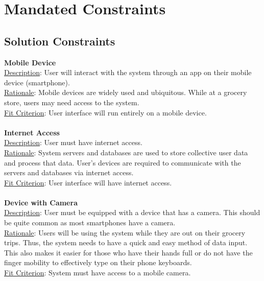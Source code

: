 \documentclass[12pt]{article}
\begin{document}
\section{Mandated Constraints}
\subsection{Solution Constraints}
\textbf{Mobile Device}\\
\underline{Description}: User will interact with the system through an app on their mobile device (smartphone).\\
\underline{Rationale}: Mobile devices are widely used and ubiquitous. While at a grocery store, users may need access to the system.\\
\underline{Fit Criterion}: User interface will run entirely on a mobile device.\\
\\
\textbf{Internet Access}\\ %
\underline{Description}: User must have internet access.\\
\underline{Rationale}: System servers and databases are used to store collective user data and process that data. User's devices are required to communicate with the servers and databases via internet access.\\
\underline{Fit Criterion}: User interface will have internet access.\\
\\
\textbf{Device with Camera}\\
\underline{Description}: User must be equipped with a device that has a camera. This should be quite common as most smartphones have a camera.\\
\underline{Rationale}: Users will be using the system while they are out on their grocery trips. Thus, the system needs to have a quick and easy method of data input. This also makes it easier for those who have their hands full or do not have the finger mobility to effectively type on their phone keyboards.\\
\underline{Fit Criterion}: System must have access to a mobile camera.\\
\end{document}
